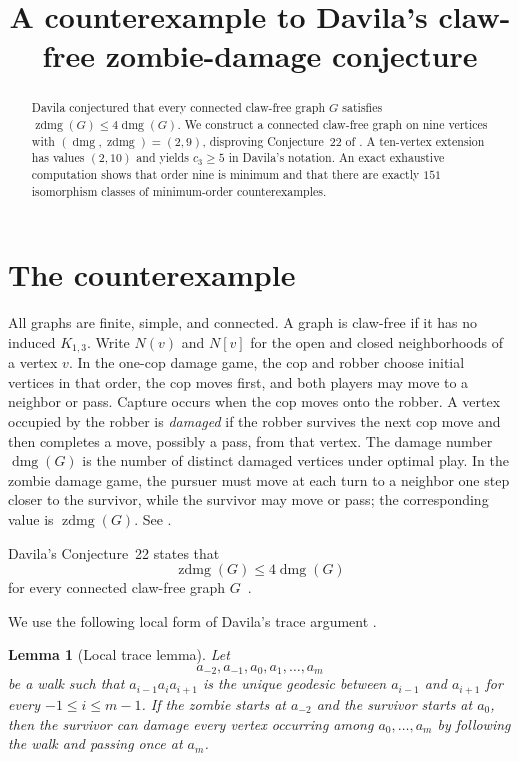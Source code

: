 \documentclass[11pt]{amsart}
\title[A claw-free zombie-damage counterexample]
      {A counterexample to Davila's claw-free zombie-damage conjecture}
\date{}
\newtheorem{lemma}[theorem]{Lemma}
\DeclareMathOperator{\dmg}{dmg}
\DeclareMathOperator{\zdmg}{zdmg}
\begin{document}
\begin{abstract}
Davila conjectured that every connected claw-free graph $G$ satisfies
$\zdmg(G)\leq 4\dmg(G)$. We construct a connected claw-free graph on nine
vertices with $(\dmg,\zdmg)=(2,9)$, disproving Conjecture~22 of
\cite{Davila}. A ten-vertex extension has values $(2,10)$ and yields
$c_3\geq 5$ in Davila's notation. An exact exhaustive computation shows
that order nine is minimum and that there are exactly $151$ isomorphism
classes of minimum-order counterexamples.
\end{abstract}

\maketitle

\section{The counterexample}

All graphs are finite, simple, and connected. A graph is claw-free if it
has no induced $K_{1,3}$. Write $N(v)$ and $N[v]$ for the open and closed
neighborhoods of a vertex $v$. In the one-cop damage game, the cop and robber
choose initial vertices in that order, the cop moves first, and both players
may move to a neighbor or pass. Capture occurs when the cop moves onto the
robber. A vertex occupied by the robber is \emph{damaged} if the robber
survives the next cop move and then completes a move, possibly a pass, from
that vertex. The damage number $\dmg(G)$ is the number of distinct damaged
vertices under optimal play. In the zombie damage game, the pursuer must move
at each turn to a neighbor one step closer to the survivor, while the survivor
may move or pass; the corresponding value is $\zdmg(G)$. See
\cite{CoxSanaei,Davila}.

Davila's Conjecture~22 states that
\begin{equation}\label{eq:davila}
  \zdmg(G)\leq 4\dmg(G)
\end{equation}
for every connected claw-free graph $G$~\cite[Conjecture~22]{Davila}.

We use the following local form of Davila's trace argument
\cite[Lemma~12]{Davila}.

\begin{lemma}[Local trace lemma]\label{lem:trace}
Let
\[
  a_{-2},a_{-1},a_0,a_1,\ldots,a_m
\]
be a walk such that $a_{i-1}a_i a_{i+1}$ is the unique geodesic between
$a_{i-1}$ and $a_{i+1}$ for every $-1\leq i\leq m-1$. If the zombie starts
at $a_{-2}$ and the survivor starts at $a_0$, then the survivor can damage
every vertex occurring among $a_0,\ldots,a_m$ by following the walk and
passing once at $a_m$.
\end{lemma}
\end{document}

